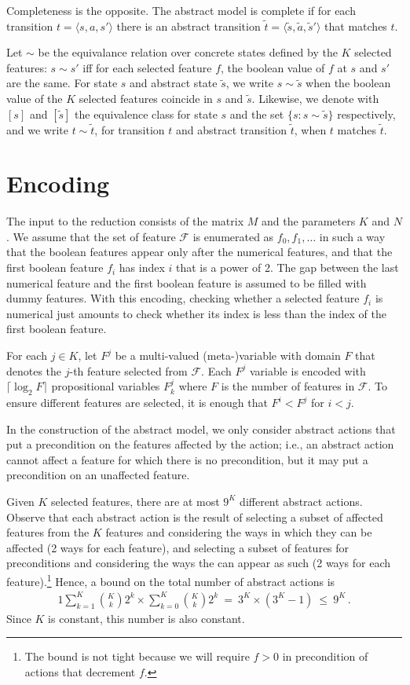 \documentclass[10pt]{article}
\newcommand{\tup}[1]{\langle #1 \rangle}
\newcommand{\F}{\mathcal{F}}
\begin{document}
Completeness is the opposite. The abstract model is complete if for each
transition $t=\tup{s,a,s'}$ there is an abstract transition
$\tilde t=\tup{\tilde s,\tilde a,\tilde s'}$ that matches $t$.

Let $\sim$ be the equivalance relation over concrete states defined by
the $K$ selected features: $s\sim s'$ iff for each selected feature $f$,
the boolean value of $f$ at $s$ and $s'$ are the same. For state $s$
and abstract state $\tilde s$, we write $s\sim\tilde s$ when the boolean
value of the $K$ selected features coincide in $s$ and $\tilde s$.
Likewise, we denote with $[s]$ and $[\tilde s]$ the equivalence class
for state $s$ and the set $\{s:s\sim\tilde s\}$ respectively, and
we write $t\sim\tilde t$, for transition $t$ and abstract transition $\tilde t$,
when $t$ matches $\tilde t$.


\section{Encoding}

The input to the reduction consists of the matrix $M$ and the parameters
$K$ and $N$. We assume that the set of feature $\F$ is enumerated as
$f_0, f_1,\ldots$ in such a way that the boolean features appear only
after the numerical features, and that the first boolean feature $f_i$
has index $i$ that is a power of 2. The gap between the last numerical
feature and the first boolean feature is assumed to be filled with dummy
features.
With this encoding, checking whether a selected feature $f_i$ is numerical
just amounts to check whether its index is less than the index of the first
boolean feature.

For each $j\in K$, let $F^j$ be a multi-valued (meta-)variable with domain
$F$ that denotes the $j$-th feature selected from $\F$.
Each $F^j$ variable is encoded with $\lceil \log_2 F \rceil$ propositional
variables $F^j_k$ where $F$ is the number of features in $\F$.
To ensure different features are selected, it is enough that $F^i<F^j$ for
$i<j$.

In the construction of the abstract model, we only consider abstract actions
that put a precondition on the features affected by the action; i.e., an
abstract action cannot affect a feature for which there is no precondition,
but it may put a precondition on an unaffected feature.

Given $K$ selected features, there are at most $9^K$ different abstract actions.
Observe that each abstract action is the result of selecting a subset of affected
features from the $K$ features and considering the ways in which they can
be affected (2 ways for each feature), and selecting a subset of features
for preconditions and considering the ways the can appear as such (2 ways
for each feature).\footnote{The bound is not tight because we will require
  $f>0$ in precondition of actions that decrement $f$.}
Hence, a bound on the total number of abstract actions is
\begin{alignat}{1}
  \sum_{k=1}^K \binom{K}{k} 2^k \times \sum_{k=0}^{K} \binom{K}{k} 2^k\ =\ 3^K \times (3^K - 1)\ \leq\ 9^K \,.
\end{alignat}
Since $K$ is constant, this number is also constant.
\end{document}
